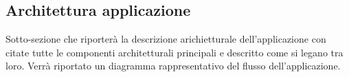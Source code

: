 \subsection{Architettura applicazione}

Sotto-sezione che riporterà la descrizione arichietturale dell'applicazione con citate tutte le componenti architetturali principali e descritto come si legano tra loro.
Verrà riportato un diagramma rappresentativo del flusso dell'applicazione.
